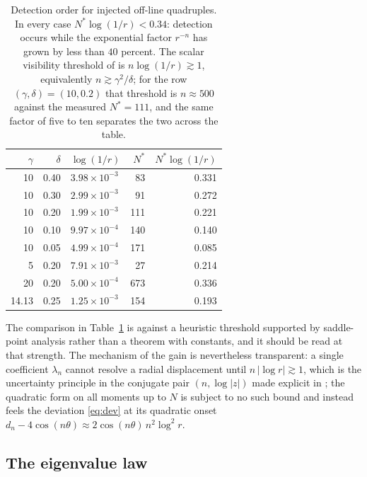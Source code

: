 \documentclass[11pt,oneside]{article}
\theoremstyle{remark}
\begin{document}
\begin{table}[ht]
\centering
\begin{tabular}{rrlrr}
\toprule
$\gamma$ & $\delta$ & $\log(1/r)$ & $N^{*}$ & $N^{*}\log(1/r)$ \\
\midrule
10    & 0.40 & $3.98\times10^{-3}$ & 83  & 0.331 \\
10    & 0.30 & $2.99\times10^{-3}$ & 91  & 0.272 \\
10    & 0.20 & $1.99\times10^{-3}$ & 111 & 0.221 \\
10    & 0.10 & $9.97\times10^{-4}$ & 140 & 0.140 \\
10    & 0.05 & $4.99\times10^{-4}$ & 171 & 0.085 \\
5     & 0.20 & $7.91\times10^{-3}$ & 27  & 0.214 \\
20    & 0.20 & $5.00\times10^{-4}$ & 673 & 0.336 \\
14.13 & 0.25 & $1.25\times10^{-3}$ & 154 & 0.193 \\
\bottomrule
\end{tabular}
\caption{Detection order for injected off-line quadruples. In every case
$N^{*}\log(1/r) < 0.34$: detection occurs while the exponential factor
$r^{-n}$ has grown by less than $40$ percent. The scalar visibility threshold
of \cite{VorosSharp,VorosBook} is $n\log(1/r) \gtrsim 1$, equivalently
$n \gtrsim \gamma^2/\delta$; for the row $(\gamma,\delta) = (10, 0.2)$ that
threshold is $n \approx 500$ against the measured $N^{*} = 111$, and the same
factor of five to ten separates the two across the table.}
\label{tab:detect}
\end{table}

The comparison in Table~\ref{tab:detect} is against a heuristic threshold
supported by saddle-point analysis rather than a theorem with constants, and it
should be read at that strength. The mechanism of the gain is nevertheless
transparent: a single coefficient $\lambda_n$ cannot resolve a radial
displacement until $n\,|{\log r}| \gtrsim 1$, which is the uncertainty
principle in the conjugate pair $(n, \log|z|)$ made explicit in
\cite{VorosBook}; the quadratic form on all moments up to $N$ is subject to no
such bound and instead feels the deviation \eqref{eq:dev} at its quadratic
onset $d_n - 4\cos(n\theta) \approx 2\cos(n\theta)\,n^2\log^2 r$.

\subsection{The eigenvalue law}\label{sec:law}
\end{document}
